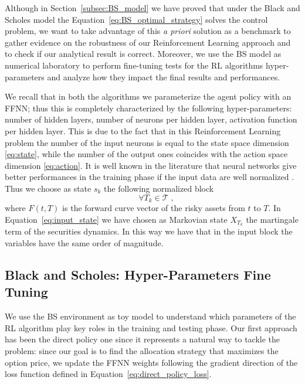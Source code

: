 \documentclass[11pt]{article}
\begin{document}
Although in Section~\ref{subsec:BS_model} we have proved that under the Black and Scholes model the Equation~\eqref{eq:BS_optimal_strategy} solves the control problem, we want to take advantage of this \textit{a priori} solution as a benchmark to gather evidence on the robustness of our Reinforcement Learning approach and to check if our analytical result is correct. Moreover, we use the BS model as numerical laboratory to perform fine-tuning tests for the RL algorithms hyper-parameters and analyze how they impact the final results and performances.

We recall that in both the algorithms we parameterize the agent policy with an FFNN; thus this is completely characterized by the following hyper-parameters: number of hidden layers, number of neurons per hidden layer, activation function per hidden layer. This is due to the fact that in this Reinforcement Learning problem the number of the input neurons is equal to the state space dimension \eqref{eq:state}, while the number of the output ones coincides with the action space dimension \eqref{eq:action}. It is well known in the literature that neural networks give better performances in the training phase if the input data are well normalized \citep{Sola1997,Puheim2014} . Thus we choose as state $s_k$ the following normalized block  
\begin{equation}
	[\log(S_{T_k}/F(0,T_k)), I_{T_k}/I_0, T_k ] \quad \forall T_k\in\mathcal{T} \; ,
\label{eq:input_state}\end{equation}
where $F(t,T)$ is the forward curve vector of the risky assets from $t$ to $T$. In Equation~\eqref{eq:input_state} we have chosen as Markovian state $X_{T_k}$ the martingale term of the securities dynamics. In this way we have that in the input block the variables have the same order of magnitude.


\subsection{Black and Scholes: Hyper-Parameters Fine Tuning}
We use the BS environment as toy model to understand which parameters of the RL algorithm play key roles in the training and testing phase. 
Our first approach has been the direct policy one since it represents a natural way to tackle the problem: since our goal is to find the allocation 
strategy that maximizes the option price, we update the FFNN weights following the gradient direction of the loss function defined in Equation~\eqref{eq:direct_policy_loss}. 
\end{document}
